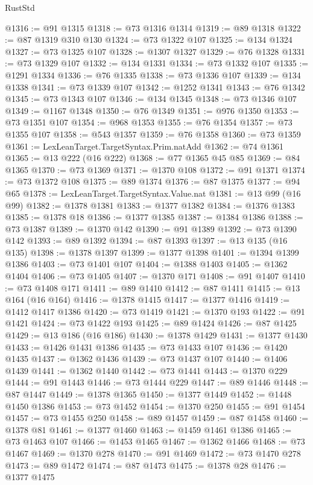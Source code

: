 \begin{lexlean}{RustStd}
\begin{coremodule}
{\begin{coremodule}
{{{{{@1316 := @91 @1315
@1318 := @73 @1316 @1314
@1319 := @89 @1318
@1322 := @87 @1319 @310 @130
@1324 := @73 @1322 @107
@1325 := @134 @1324
@1327 := @73 @1325 @107
@1328 := @1307 @1327
@1329 := @76 @1328
@1331 := @73 @1329 @107
@1332 := @134 @1331
@1334 := @73 @1332 @107
@1335 := @1291 @1334
@1336 := @76 @1335
@1338 := @73 @1336 @107
@1339 := @134 @1338
@1341 := @73 @1339 @107
@1342 := @1252 @1341
@1343 := @76 @1342
@1345 := @73 @1343 @107
@1346 := @134 @1345
@1348 := @73 @1346 @107
@1349 := @1167 @1348
@1350 := @76 @1349
@1351 := @976 @1350
@1353 := @73 @1351 @107
@1354 := @968 @1353
@1355 := @76 @1354
@1357 := @73 @1355 @107
@1358 := @543 @1357
@1359 := @76 @1358
@1360 := @73 @1359
@1361 := LexLeanTarget.TargetSyntax.Prim.natAdd
@1362 := @74 @1361
@1365 := @13 @222 (@16 @222)
@1368 := @77 @1365 @45 @85
@1369 := @84 @1365
@1370 := @73 @1369
@1371 := @1370 @108
@1372 := @91 @1371
@1374 := @73 @1372 @108
@1375 := @89 @1374
@1376 := @87 @1375
@1377 := @94 @65
@1378 := LexLeanTarget.TargetSyntax.Value.nat
@1381 := @13 @99 (@16 @99)
@1382 := @1378 @1381
@1383 := @1377 @1382
@1384 := @1376 @1383
@1385 := @1378 @18
@1386 := @1377 @1385
@1387 := @1384 @1386
@1388 := @73 @1387
@1389 := @1370 @142
@1390 := @91 @1389
@1392 := @73 @1390 @142
@1393 := @89 @1392
@1394 := @87 @1393
@1397 := @13 @135 (@16 @135)
@1398 := @1378 @1397
@1399 := @1377 @1398
@1401 := @1394 @1399 @1386
@1403 := @73 @1401 @107
@1404 := @1388 @1403
@1405 := @1362 @1404
@1406 := @73 @1405
@1407 := @1370 @171
@1408 := @91 @1407
@1410 := @73 @1408 @171
@1411 := @89 @1410
@1412 := @87 @1411
@1415 := @13 @164 (@16 @164)
@1416 := @1378 @1415
@1417 := @1377 @1416
@1419 := @1412 @1417 @1386
@1420 := @73 @1419
@1421 := @1370 @193
@1422 := @91 @1421
@1424 := @73 @1422 @193
@1425 := @89 @1424
@1426 := @87 @1425
@1429 := @13 @186 (@16 @186)
@1430 := @1378 @1429
@1431 := @1377 @1430
@1433 := @1426 @1431 @1386
@1435 := @73 @1433 @107
@1436 := @1420 @1435
@1437 := @1362 @1436
@1439 := @73 @1437 @107
@1440 := @1406 @1439
@1441 := @1362 @1440
@1442 := @73 @1441
@1443 := @1370 @229
@1444 := @91 @1443
@1446 := @73 @1444 @229
@1447 := @89 @1446
@1448 := @87 @1447
@1449 := @1378 @1365
@1450 := @1377 @1449
@1452 := @1448 @1450 @1386
@1453 := @73 @1452
@1454 := @1370 @250
@1455 := @91 @1454
@1457 := @73 @1455 @250
@1458 := @89 @1457
@1459 := @87 @1458
@1460 := @1378 @81
@1461 := @1377 @1460
@1463 := @1459 @1461 @1386
@1465 := @73 @1463 @107
@1466 := @1453 @1465
@1467 := @1362 @1466
@1468 := @73 @1467
@1469 := @1370 @278
@1470 := @91 @1469
@1472 := @73 @1470 @278
@1473 := @89 @1472
@1474 := @87 @1473
@1475 := @1378 @28
@1476 := @1377 @1475
}}}}}
\end{coremodule}}
\end{coremodule}
\end{lexlean}
